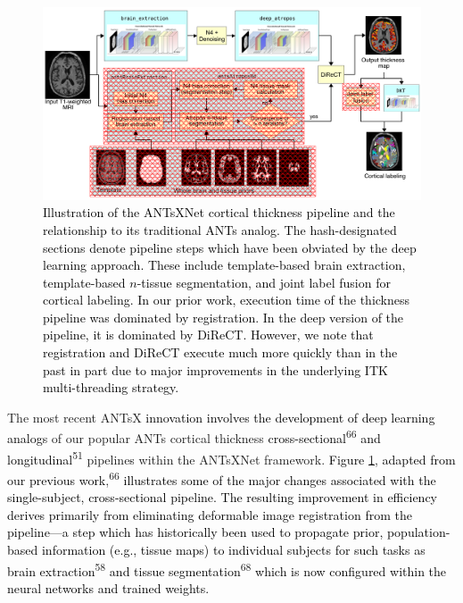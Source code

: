 \documentclass[
  12pt,
]{article}
\begin{document}
\begin{figure}[htb]
  \centering
    \includegraphics[width=\textwidth]{Figures/antsxnetPipeline.pdf}
  \caption{\textcolor{black}{Illustration of the ANTsXNet cortical thickness pipeline and the
  relationship to its traditional ANTs analog.  The hash-designated sections
  denote pipeline steps which have been obviated by the deep learning approach.
  These include template-based brain extraction, template-based $n$-tissue
  segmentation, and joint label fusion for cortical labeling.  In our prior work, execution time of the thickness pipeline was dominated by registration.  In the deep version of the pipeline,
it is dominated by DiReCT.  However, we note that  registration and DiReCT execute much more quickly than in the past in part due to major improvements in the underlying ITK multi-threading strategy.}}
  \label{fig:pipeline}
\end{figure}

The most recent ANTsX
\textcolor{black}{innovation involves the development of
deep learning analogs} of our popular ANTs cortical thickness
\textcolor{black}{cross-sectional}\textsuperscript{66}
\textcolor{black}{and
longitudinal}\textsuperscript{51} pipeline\textcolor{black}{s} within
the ANTsXNet framework. \textcolor{black}{Figure} \ref{fig:pipeline},
\textcolor{black}{adapted from our previous work},\textsuperscript{66}
\textcolor{black}{illustrates some of the major changes associated with the
single-subject, cross-sectional pipeline.  The resulting improvement in efficiency
derives primarily from eliminating deformable image registration from the
pipeline---a step which has historically been used to propagate prior,
population-based information (e.g., tissue maps) to individual subjects for such
tasks as brain extraction}\textsuperscript{58}
\textcolor{black}{and tissue
segmentation}\textsuperscript{68}
\textcolor{black}{which is now configured within
the neural networks and trained weights.}
\end{document}
